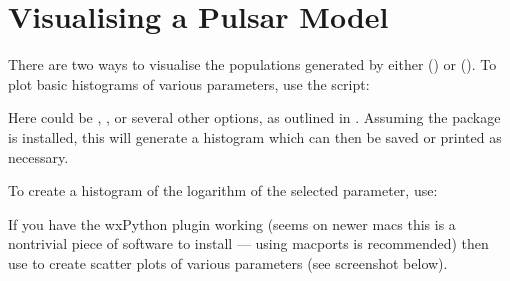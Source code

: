 \documentclass[letterpaper,10pt,english]{sphinxmanual}
\begin{document}
\section{Visualising a Pulsar Model}
\label{\detokenize{tutorial-basic:visualising-a-pulsar-model}}\label{\detokenize{tutorial-basic:visualise-model}}
\sphinxAtStartPar
There are two ways to visualise the populations generated by either
 () or  (). To plot
basic histograms of various parameters, use the  script:

\begin{sphinxVerbatim}[commandchars=\\\{\}]
     
\end{sphinxVerbatim}

\sphinxAtStartPar
Here  could be , , or several other options,
as outlined in . Assuming the 
package is installed, this will generate a histogram which can then be
saved or printed as necessary.

\sphinxAtStartPar
To create a histogram of the logarithm of the selected parameter, use:

\begin{sphinxVerbatim}[commandchars=\\\{\}]
      
\end{sphinxVerbatim}

\sphinxAtStartPar
If you have the wxPython plugin working (seems on newer macs this is a non\sphinxhyphen{}trivial
piece of software to install — using macports is recommended) then use 
to create scatter plots of various parameters (see screenshot below).

\noindent{}
\end{document}
